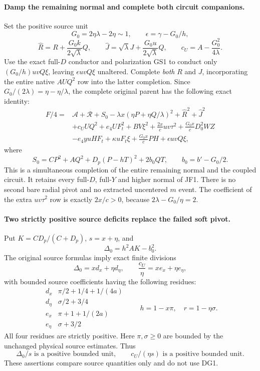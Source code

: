 \paragraph{Damp the remaining normal and complete both circuit companions.}
Set the positive source unit
\[
 G_0=2\eta\lambda-2\eta\sim1,\qquad
 \epsilon=\gamma-G_0/h,
\]
\[
 \widehat R=R+\frac{G_0k}{2\sqrt\lambda}Q,
 \qquad \widehat J=\sqrt\lambda J+
                         \frac{G_0u}{2\sqrt\lambda}Q,
 \qquad c_U=A-\frac{G_0^2}{4\lambda}.
\]
Use the exact full-$D$ conductor and polarization GS1 to conduct only
$(G_0/h)uvQ\xi$, leaving $\epsilon uvQ\xi$ unaltered. Complete
\emph{both} $R$ and $J$, incorporating the entire native $AUQ^2$
row into the latter completion. Since
$G_0/(2\lambda)=\eta-\eta/\lambda$, the complete original parent
has the following exact identity:
\[
\begin{split}
 F/4={}&\mathscr A+\mathscr R+S_0
    -\lambda x(\eta P+\eta Q/\lambda)^2
    +\widehat R^2+\widehat J^2\\
 &+c_UUQ^2+e_4UF_t^2+BV\xi^2
    +\frac{2x}{c}uv\tau^2
    +\frac{G_0x}{c}D_0^2WZ\\
 &-e_4yuHF_t+\kappa uF_t\xi
                 +\frac{G_0x}{c}PH+\epsilon uvQ\xi,       
\end{split}\tag{DG3}
\]
where
\[
 S_0=CP^2+AQ^2+D_p(P-hT)^2+2b_0QT,
 \qquad b_0=b'-G_0/2.                                 \tag{DG4}
\]
This is a simultaneous completion of the entire remaining normal and
the coupled circuit. It retains every full-$D$, full-$Y$ and higher
normal of JF1. There is no second bare radial pivot and no extracted
uncentered $m$ event. The coefficient of the extra $uv\tau^2$ row
is exactly $2x/c>0$, because $2\lambda-G_0/\eta=2$.

\paragraph{Two strictly positive source deficits replace the failed soft pivot.}
Put $K=CD_p/(C+D_p)$, $s=x+\eta$, and
\[
                         \Delta_0=h^2AK-b_0^2.
\]
The original source formulas imply exact finite divisions
\[
 \Delta_0=x d_x+\eta d_\eta,\qquad
 \frac{c_U}{\eta}=x e_x+\eta e_\eta,                \tag{DG5}
\]
with bounded source coefficients having the following residues:
\[
 \begin{array}{c|c}
 d_x&\pi/2+1/4+1/(4a)\\
 d_\eta&\sigma/2+3/4\\
 e_x&\pi+1+1/(2a)\\
 e_\eta&\sigma+3/2
 \end{array}
 \qquad h=1-x\pi,\quad r=1-\eta\sigma.             \tag{DG6}
\]
All four residues are strictly positive. Here $\pi,\sigma\ge0$
are bounded by the unchanged physical source estimates. Thus
\[
 \Delta_0/s\text{ is a positive bounded unit},\qquad
 c_U/(\eta s)\text{ is a positive bounded unit}.     \tag{DG7}
\]
These assertions compare source quantities only and do not use DG1.

